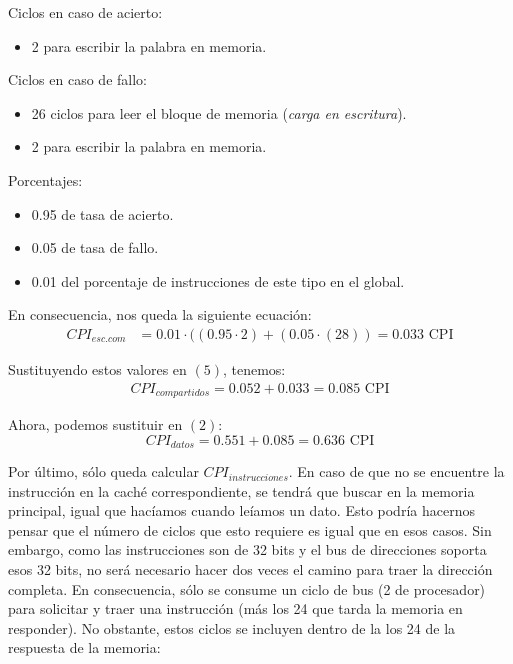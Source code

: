 \documentclass[12pt,a4paper]{article}
\begin{document}
Ciclos en caso de acierto:
\begin{itemize}
\item 2 para escribir la palabra en memoria.
\end{itemize}

Ciclos en caso de fallo:
\begin{itemize}
\item 26 ciclos para leer el bloque de memoria (\textit{carga en escritura}).
\item 2 para escribir la palabra en memoria.
\end{itemize}

Porcentajes:
\begin{itemize}
\item 0.95 de tasa de acierto.
\item 0.05 de tasa de fallo.
\item 0.01 del porcentaje de instrucciones de este tipo en el global.
\end{itemize}

En consecuencia, nos queda la siguiente ecuación:
\begin{align*}
CPI_{esc.com}&=0.01\cdot ((0.95\cdot 2)+(0.05\cdot (28))=0.033\text{ CPI}
\end{align*}

Sustituyendo estos valores en $(5)$, tenemos:
\begin{align*}
CPI_{compartidos}=0.052+0.033=0.085 \text{ CPI}
\end{align*}

Ahora, podemos sustituir en $(2)$:
\begin{equation*}
CPI_{datos}=0.551+0.085=0.636\text{ CPI}
\end{equation*}

Por último, sólo queda calcular $CPI_{instrucciones}$. En caso de que no se encuentre la instrucción en la caché correspondiente, se tendrá que buscar en la memoria principal, igual que hacíamos cuando leíamos un dato. Esto podría hacernos pensar que el número de ciclos que esto requiere es igual que en esos casos. Sin embargo, como las instrucciones son de 32 bits y el bus de direcciones soporta esos 32 bits, no será necesario hacer dos veces el camino para traer la dirección completa. En consecuencia, sólo se consume un ciclo de bus (2 de procesador) para solicitar y traer una instrucción (más los 24 que tarda la memoria en responder). No obstante, estos ciclos se incluyen dentro de la los 24 de la respuesta de la memoria:\\
\end{document}
